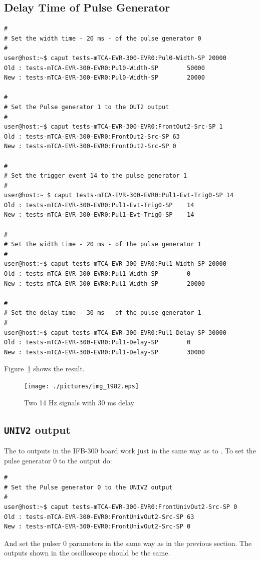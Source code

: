 \documentclass[11pt
  , a4paper
  , article
  , oneside
  , showtrims
]{memoir}
\begin{document}
\subsection{Delay Time of Pulse Generator}
\begin{lstlisting}[style=termstyle]
#
# Set the width time - 20 ms - of the pulse generator 0 
#
user@host:~$ caput tests-mTCA-EVR-300-EVR0:Pul0-Width-SP 20000
Old : tests-mTCA-EVR-300-EVR0:Pul0-Width-SP        50000
New : tests-mTCA-EVR-300-EVR0:Pul0-Width-SP        20000

#
# Set the Pulse generator 1 to the OUT2 output
# 
user@host:~$ caput tests-mTCA-EVR-300-EVR0:FrontOut2-Src-SP 1
Old : tests-mTCA-EVR-300-EVR0:FrontOut2-Src-SP 63
New : tests-mTCA-EVR-300-EVR0:FrontOut2-Src-SP 0

#
# Set the trigger event 14 to the pulse generator 1
#
user@host:~ $ caput tests-mTCA-EVR-300-EVR0:Pul1-Evt-Trig0-SP 14
Old : tests-mTCA-EVR-300-EVR0:Pul1-Evt-Trig0-SP    14
New : tests-mTCA-EVR-300-EVR0:Pul1-Evt-Trig0-SP    14

#
# Set the width time - 20 ms - of the pulse generator 1 
#
user@host:~$ caput tests-mTCA-EVR-300-EVR0:Pul1-Width-SP 20000
Old : tests-mTCA-EVR-300-EVR0:Pul1-Width-SP        0
New : tests-mTCA-EVR-300-EVR0:Pul1-Width-SP        20000

#
# Set the delay time - 30 ms - of the pulse generator 1 
#
user@host:~$ caput tests-mTCA-EVR-300-EVR0:Pul1-Delay-SP 30000
Old : tests-mTCA-EVR-300-EVR0:Pul1-Delay-SP        0
New : tests-mTCA-EVR-300-EVR0:Pul1-Delay-SP        30000
\end{lstlisting}
Figure~\ref{fig:delay} shows the result.
\begin{figure}[!htb]
  \centering
    \texttt{[image: ./pictures/img\_1982.eps]}
  \caption{Two 14 Hz signals with 30 ms delay}
  \label{fig:delay}
\end{figure}


\subsection{\texttt{UNIV2} output}
The  to  outputs in the IFB-300 board work just in the same way as  to . To set the pulse generator 0 to the  output do:
\begin{lstlisting}[style=termstyle]
#
# Set the Pulse generator 0 to the UNIV2 output
# 
user@host:~$ caput tests-mTCA-EVR-300-EVR0:FrontUnivOut2-Src-SP 0
Old : tests-mTCA-EVR-300-EVR0:FrontUnivOut2-Src-SP 63
New : tests-mTCA-EVR-300-EVR0:FrontUnivOut2-Src-SP 0
\end{lstlisting}
And set the pulser 0 parameters in the same way as in the previous section. The outputs shown in the oscilloscope should be the same.
\end{document}
